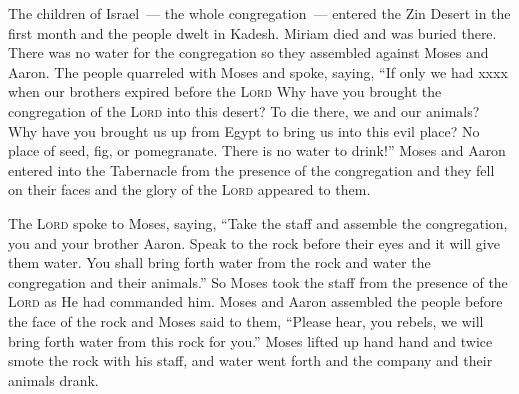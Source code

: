 
\begin{inparaenum}
     The children of Israel~--- the whole congregation~--- entered the Zin Desert in the first month and the people dwelt in Kadesh. Miriam died and was buried there.%
     There was no water for the congregation so they assembled against Moses and Aaron.%
     The people quarreled with Moses and spoke, saying, ``If only we had xxxx when our brothers expired before the \textsc{Lord}%
     Why have you brought the congregation of the \textsc{Lord} into this desert? To die there, we and our animals?%
     Why have you brought us up from Egypt to bring us into this evil place? No place of seed, fig, or pomegranate. There is no water to drink!''%
     Moses and Aaron entered into the Tabernacle from the presence of the congregation and they fell on their faces and the glory of the \textsc{Lord} appeared to them.%
    
     The \textsc{Lord} spoke to Moses, saying,%
     ``Take the staff and assemble the congregation, you and your brother Aaron. Speak to the rock before their eyes and it will give them water. You shall bring forth water from the rock and water the congregation and their animals.''%
     So Moses took the staff from the presence of the \textsc{Lord} as He had commanded him.%
     Moses and Aaron assembled the people before the face of the rock and Moses said to them, ``Please hear, you rebels, we will bring forth water from this rock for you.''%
     Moses lifted up hand hand and twice smote the rock with his staff, and water went forth and the company and their animals drank.%
    

\end{inparaenum}

